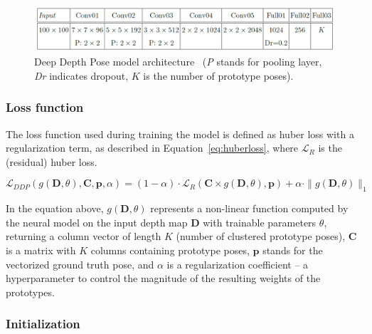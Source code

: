 \vspace{5mm}
\begin{figure}[H]
\begin{center}
  \includegraphics[width=\textwidth]{images/implementation/ddp.PNG}
  \caption[Deep Depth Pose model architecture~\cite{Marin18jvcir}.]{Deep Depth Pose model architecture~\cite{Marin18jvcir} (\textit{P} stands for pooling layer, \textit{Dr} indicates dropout, $K$ is the number of prototype poses).}
  \label{fig:ddp}
\end{center}
\end{figure}


\subsubsection{Loss function}

The loss function used during training the model is defined as huber loss with a regularization term, as described in Equation~\ref{eq:huberloss}, where $\mathcal{L}_R$ is the (residual) huber loss.\par

\begin{equation}
\mathcal{L}_{DDP}(g(\mathbf{D}, \theta), \mathbf{C}, \mathbf{p}, \alpha) = (1 - \alpha) \cdot \mathcal{L}_R(\mathbf{C} \times g(\mathbf{D}, \theta), \mathbf{p}) + \alpha \cdot \|g(\mathbf{D}, \theta)\|_1 \label{eq:huberloss}
\end{equation} 

\noindent In the equation above, $g(\mathbf{D}, \theta)$ represents a non-linear function computed by the neural model on the input depth map $\mathbf{D}$ with trainable parameters $\theta$, returning a column vector of length $K$ (number of clustered prototype poses), $\mathbf{C}$ is a matrix with $K$ columns containing prototype poses, $\mathbf{p}$ stands for the vectorized ground truth pose,  and $\alpha$ is a regularization coefficient  – a hyperparameter to control the magnitude of the resulting weights of the prototypes.

\subsubsection{Initialization}

